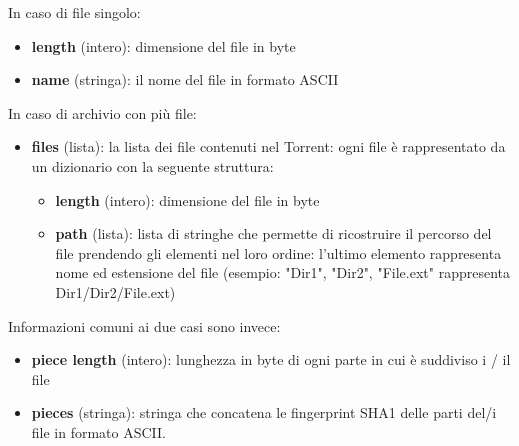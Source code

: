 \documentclass[a4]{book}
\begin{document}
In caso di file singolo:
\begin{itemize}	
	\item \textbf{length} (intero): dimensione del file in byte
	\item \textbf{name} (stringa): il nome del file in formato ASCII
\end{itemize}	
In caso di archivio con più file:
\begin{itemize}	
	\item \textbf{files} (lista): la lista dei file contenuti nel Torrent: ogni file è rappresentato da un dizionario con la seguente struttura:
	\begin{itemize}	
	\item \textbf{length} (intero): dimensione del file in byte
	\item \textbf{path} (lista): lista di stringhe che permette di ricostruire il percorso del file prendendo gli elementi nel loro ordine: l'ultimo elemento rappresenta nome ed estensione del file (esempio: "Dir1", "Dir2", "File.ext" rappresenta Dir1/Dir2/File.ext)
	\end{itemize}
\end{itemize}
Informazioni comuni ai due casi sono invece:
\begin{itemize}
		\item \textbf{piece length} (intero): lunghezza in byte di ogni parte in cui è suddiviso i / il file
		\item \textbf{pieces} (stringa): stringa che concatena le fingerprint SHA1 delle parti del/i file in formato ASCII.
\end{itemize}
\end{document}
